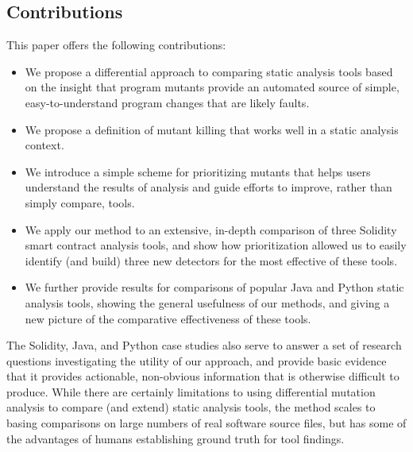 \subsection{Contributions}

This paper offers the following contributions:

\begin{itemize}
\item We propose a differential approach to comparing static analysis tools based on the insight that program mutants provide an automated source of simple, easy-to-understand program changes that are likely faults.
\item We propose a definition of mutant killing that works well in a static analysis context.
\item We introduce a simple scheme for prioritizing mutants that helps users understand the results of analysis and guide efforts to improve, rather than simply compare, tools.
\item We apply our method to an extensive, in-depth comparison of three Solidity smart contract analysis tools, and show how prioritization allowed us to easily identify (and build) three new detectors for the most effective of these tools.
\item We further provide results for comparisons of popular Java and Python static analysis tools, showing the general usefulness of our methods, and giving a new picture of the comparative effectiveness of these tools.
\end{itemize}

The Solidity, Java, and Python case studies also serve to answer a set of research questions investigating the utility of our approach, and provide basic evidence that it provides actionable, non-obvious information that is otherwise difficult to produce.  While there are certainly limitations to using differential mutation analysis to compare (and extend) static analysis tools, the method scales to basing comparisons on large numbers of real software source files, but has some of the advantages of humans establishing ground truth for tool findings.